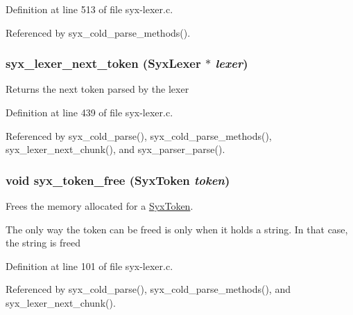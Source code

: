 Definition at line 513 of file syx-lexer.c.

Referenced by syx\_\-cold\_\-parse\_\-methods().\hypertarget{syx-lexer_8c_3d0ff30aeb654ef8a933b906f96dc483}{
\subsubsection{ syx\_\-lexer\_\-next\_\-token ({\bf SyxLexer} $\ast$ {\em lexer})}}
\label{syx-lexer_8c_3d0ff30aeb654ef8a933b906f96dc483}


Returns the next token parsed by the lexer 

Definition at line 439 of file syx-lexer.c.

Referenced by syx\_\-cold\_\-parse(), syx\_\-cold\_\-parse\_\-methods(), syx\_\-lexer\_\-next\_\-chunk(), and syx\_\-parser\_\-parse().\hypertarget{syx-lexer_8c_5e759dcd70d8f633018d9687de77ff1e}{
\subsubsection{\setlength{\rightskip}{0pt plus 5cm}void syx\_\-token\_\-free ({\bf SyxToken} {\em token})}}
\label{syx-lexer_8c_5e759dcd70d8f633018d9687de77ff1e}


Frees the memory allocated for a \hyperlink{struct_syx_token}{SyxToken}.

The only way the token can be freed is only when it holds a string. In that case, the string is freed 

Definition at line 101 of file syx-lexer.c.

Referenced by syx\_\-cold\_\-parse(), syx\_\-cold\_\-parse\_\-methods(), and syx\_\-lexer\_\-next\_\-chunk().
